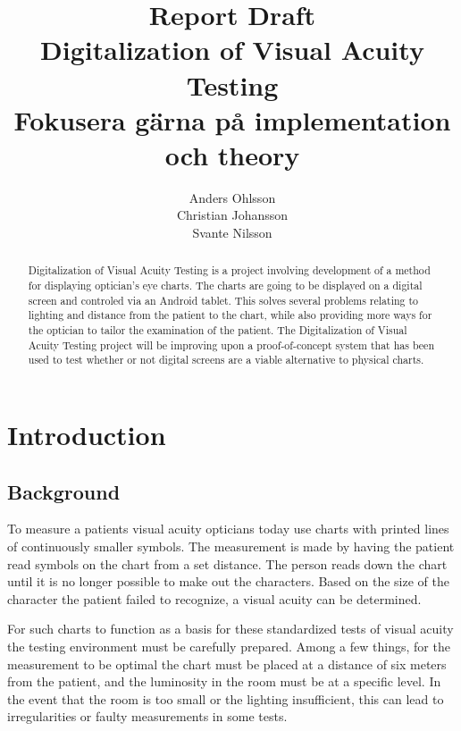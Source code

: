\documentclass[12pt,a4paper,notitlepage]{report}
\begin{document}

\title{Report Draft\\Digitalization of Visual Acuity Testing\\
Fokusera gärna på implementation och theory}
\author{Anders Ohlsson\\Christian Johansson\\Svante Nilsson}
\maketitle

\begin{abstract}
Digitalization of Visual Acuity Testing is a project involving development of a method for displaying optician's eye charts. The charts are going to be displayed on a digital screen and controled via an Android tablet. This solves several problems relating to lighting and distance from the patient to the chart, while also providing more ways for the optician to tailor the examination of the patient. The Digitalization of Visual Acuity Testing project will be improving upon a proof-of-concept system that has been used to test whether or not digital screens are a viable alternative to physical charts.
\end{abstract}

\tableofcontents
\listoffigures
\clearpage

\setcounter{page}{1}
\chapter{Introduction}
\section{Background}
To measure a patients visual acuity opticians today use charts with printed lines of continuously smaller symbols. The measurement is made by having the patient read symbols on the chart from a set distance. The person reads down the chart until it is no longer possible to make out the characters. Based on the size of the character the patient failed to recognize, a visual acuity can be determined. 

For such charts to function as a basis for these standardized tests of visual acuity the testing environment must be carefully prepared. Among a few things, for the measurement to be optimal the chart must be placed at a distance of six meters from the patient, and the luminosity in the room must be at a specific level. In the event that the room is too small or the lighting insufficient, this can lead to irregularities or faulty measurements in some tests. 
\end{document}
